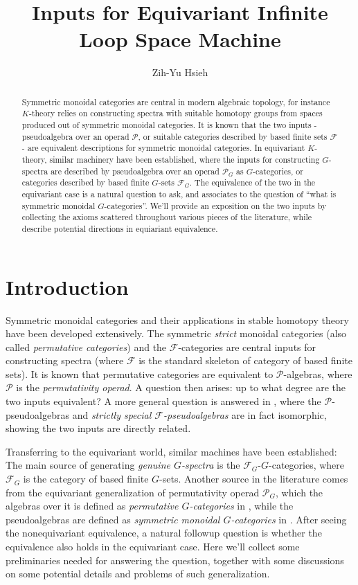 \documentclass[openany, amssymb, psamsfonts]{amsart}
\title{Inputs for Equivariant Infinite Loop Space Machine}
\author{Zih-Yu Hsieh}
\theoremstyle{definition}
\numberwithin{equation}{section}
\newcommand{\F}{\mathscr{F}} %
\newcommand{\cP}{\mathscr{P}} %
\begin{document}
\begin{abstract}
Symmetric monoidal categories are central in modern algebraic topology, for instance $K$-theory relies on constructing spectra with suitable homotopy groups from spaces produced out of symmetric monoidal categories. It is known that the two inputs - pseudoalgebra over an operad $\cP$, or suitable categories described by based finite sets $\F$ - are equivalent descriptions for symmetric monoidal categories. In equivariant $K$-theory, similar machinery have been established, where the inputs for constructing $G$-spectra are described by pseudoalgebra over an operad $\cP_G$ as $G$-categories, or categories described by based finite $G$-sets $\F_G$. The equivalence of the two in the equivariant case is a natural question to ask, and associates to the question of ``what is symmetric monoidal $G$-categories''. We'll provide an exposition on the two inputs by collecting the axioms scattered throughout various pieces of the literature, while describe potential directions in equiariant equivalence.
\end{abstract}

\maketitle

\tableofcontents

\section*{Introduction}

Symmetric monoidal categories and their applications in stable homotopy theory have been developed extensively. The symmetric \emph{strict} monoidal categories (also called \emph{permutative categories}) and the $\F$-categories are central inputs for constructing spectra (where $\F$ is the standard skeleton of category of based finite sets). It is known that permutative categories are equivalent to $\cP$-algebras, where $\cP$ is the \emph{permutativity operad}. A question then arises: up to what degree are the two inputs equivalent? A more general question is answered in \cite{LMRZ26}, where the $\cP$-pseudoalgebras and \emph{strictly special $\F$-pseudoalgebras} are in fact isomorphic, showing the two inputs are directly related.

Transferring to the equivariant world, similar machines have been established: The main source of generating \emph{genuine $G$-spectra} is the $\F_G$-$G$-categories, where $\F_G$ is the category of based finite $G$-sets. Another source in the literature comes from the equivariant generalization of permutativity operad $\cP_G$, which the algebras over it is defined as \emph{permutative $G$-categories} in \cite{GM17}, while the pseudoalgebras are defined as \emph{symmetric monoidal $G$-categories} in \cite{GMMO20}. After seeing the nonequivariant equivalence, a natural followup question is whether the equivalence also holds in the equivariant case. Here we'll collect some preliminaries needed for answering the question, together with some discussions on some potential details and problems of such generalization.
\end{document}
